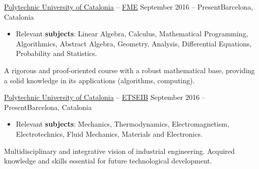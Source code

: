 \documentclass[10pt, a4paper, ragged2e]{../altacv}
\begin{document}

\begin{fullwidth}
  \makecvheader
\end{fullwidth}

\medskip
{}

{\href{https://www.upc.edu/en}{Polytechnic University of Catalonia} --
  \href{https://fme.upc.edu/en}{FME}}
{September 2016 -- Present}{Barcelona, Catalonia}
\begin{itemize}
  \item Relevant \textbf{subjects}: Linear Algebra, Calculus, Mathematical
  Programming, Algorithmics, Abstract Algebra, Geometry, Analysis, Differential
  Equations, Probability and Statistics.
\end{itemize}
A rigorous and proof-oriented course with a robust mathematical base, providing
a solid knowledge in its applications (algorithms, computing).

\divider

{\href{https://www.upc.edu/en}{Polytechnic University of Catalonia} --
\href{https://etseib.upc.edu/en}{ETSEIB}}
{September 2016 -- Present}{Barcelona, Catalonia}
\begin{itemize}
  \item Relevant \textbf{subjects}: Mechanics, Thermodynamics, Electromagnetism,
  Electrotechnics, Fluid Mechanics, Materials and Electronics.
\end{itemize}
Multidisciplinary and integrative vision of industrial engineering. Acquired
knowledge and skills essential for future technological development.
\end{document}
